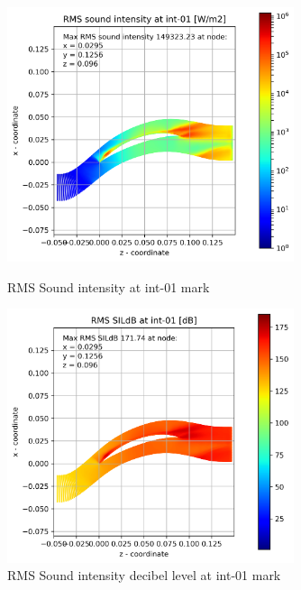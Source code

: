 \begin{figure}[ht]
  \centering
  \includegraphics[width=0.75\textwidth]{Figures/int-01-rms-sil.png}
  \caption{RMS Sound intensity at int-01 mark} \label{int-01-rms-sil}
  
  \vspace*{\floatsep}%

  \includegraphics[width=0.75\textwidth]{Figures/int-01-rms-sildb.png}
  \caption{RMS Sound intensity decibel level at int-01 mark} \label{int-01-rms-sildb}
\end{figure}

